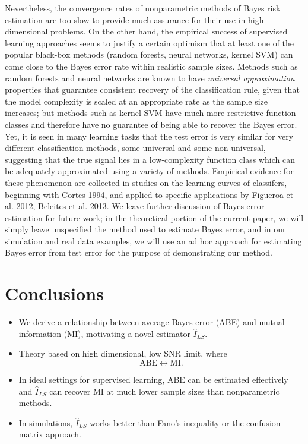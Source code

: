 \documentclass[12pt]{article}
\begin{document}
Nevertheless, the convergence rates of nonparametric methods of Bayes
risk estimation are too slow to provide much assurance for their use
in high-dimensional problems.  On the other hand, the empirical
success of supervised learning approaches seems to justify a certain
optimism that at least one of the popular black-box methods (random
forests, neural networks, kernel SVM) can come close to the Bayes
error rate within realistic sample sizes.  Methods such as random
forests and neural networks are known to have \emph{universal
approximation} properties that guarantee consistent recovery of the
classification rule, given that the model complexity is scaled at an
appropriate rate as the sample size increases; but methods such as
kernel SVM have much more restrictive function classes and therefore
have no guarantee of being able to recover the Bayes error.  Yet, it
is seen in many learning tasks that the test error is very similar for
very different classification methods, some universal and some
non-universal, suggesting that the true signal lies in a
low-complexity function class which can be adequately approximated
using a variety of methods.  Empirical evidence for these phenomenon
are collected in studies on the learning curves of classifers,
beginning with Cortes 1994, and applied to specific applications by
Figueroa et al. 2012, Beleites et al. 2013.  We leave further
discussion of Bayes error estimation for future work; in the
theoretical portion of the current paper, we will simply leave
unspecified the method used to estimate Bayes error, and in our
simulation and real data examples, we will use an ad hoc approach for
estimating Bayes error from test error for the purpose of
demonstrating our method.


\section{Conclusions}

\begin{itemize}
\item We derive a relationship between average Bayes error (ABE) and mutual
  information (MI), motivating a novel estimator $\hat{I}_{LS}$.
\item Theory based on high dimensional, low SNR limit,
where \[\text{ABE} \leftrightarrow \text{MI}.\]
\item In ideal settings for supervised learning, ABE can be estimated
  effectively and $\hat{I}_{LS}$ can recover MI at much lower sample
  sizes than nonparametric methods.
\item In simulations, $\hat{I}_{LS}$ works better than Fano's
  inequality or the confusion matrix approach.
\end{itemize}
\end{document}
